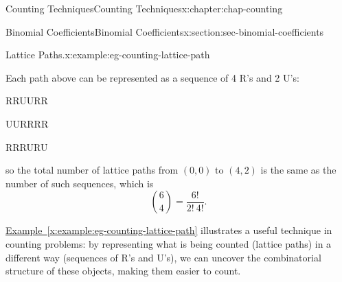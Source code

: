 \documentclass[oneside,10pt,]{book}
\newcommand{\xreffont}{\relax}
\numberwithin{equation}{section}
\begin{document}
\begin{chapterptx}{Counting Techniques}{}{Counting Techniques}{}{}{x:chapter:chap-counting}
\begin{sectionptx}{Binomial Coefficients}{}{Binomial Coefficients}{}{}{x:section:sec-binomial-coefficients}
\begin{example}{Lattice Paths.}{x:example:eg-counting-lattice-path}
\begin{sidebyside}{3}{0.0166666666666667}{0.0166666666666667}{0.0333333333333333}
\begin{sbspanel}{0.3}
{\begin{tikzpicture}[scale=0.7]
\end{tikzpicture}
}%
\end{sbspanel}%
\begin{sbspanel}{0.3}%
%
\end{sbspanel}%
\begin{sbspanel}{0.3}%
%
\end{sbspanel}%
\end{sidebyside}%
\par
Each path above can be represented as a sequence of 4 R's and 2 U's:%
\begin{sidebyside}{3}{0.0916666666666667}{0.0916666666666667}{0.183333333333333}%
\begin{sbspanel}{0.15}%
RRUURR%
\end{sbspanel}%
\begin{sbspanel}{0.15}%
\par
UURRRR%
\end{sbspanel}%
\begin{sbspanel}{0.15}%
\par
RRRURU%
\end{sbspanel}%
\end{sidebyside}%
\par
so the total number of lattice paths from \((0,0)\) to \((4,2)\) is the same as the number of such sequences, which is%
\begin{equation*}
\binom{6}{4} = \frac{6!}{2! \ 4!}\text{.}
\end{equation*}
%
\end{example}
\hyperref[x:example:eg-counting-lattice-path]{Example~{\xreffont\ref{x:example:eg-counting-lattice-path}}} illustrates a useful technique in counting problems: by representing what is being counted (lattice paths) in a different way (sequences of R's and U's), we can uncover the combinatorial structure of these objects, making them easier to count.%

\end{sectionptx}
\end{chapterptx}
\end{document}
